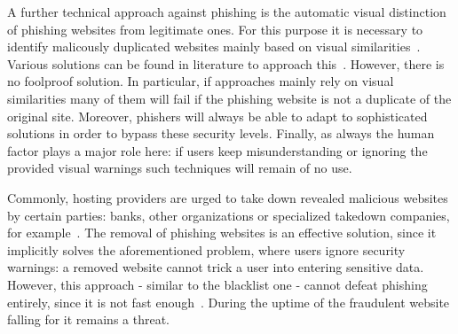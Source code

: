 \begin{description}[leftmargin=0cm]
	\item[Visual distinction] A further technical approach against phishing is the automatic visual distinction of phishing websites from legitimate ones. For this purpose it is necessary to identify malicously duplicated websites mainly based on visual similarities~\cite{liu2006antiphishing}. Various solutions can be found in literature to approach this~\cite{chen2009fighting,chen2010detecting,zhang2011textual}. However, there is no foolproof solution. In particular, if approaches mainly rely on visual similarities many of them will fail if the phishing website is not a duplicate of the original site. Moreover, phishers will always be able to adapt to sophisticated solutions in order to bypass these security levels. Finally, as always the human factor plays a major role here: if users keep misunderstanding or ignoring the provided visual warnings such techniques will remain of no use.
	\item[Takedown] Commonly, hosting providers are urged to take down revealed malicious websites by certain parties: banks, other organizations or specialized takedown companies, for example~\cite{moore2007examining}. The removal of phishing websites is an effective solution, since it implicitly solves the aforementioned problem, where users ignore security warnings: a removed website cannot trick a user into entering sensitive data. However, this approach - similar to the blacklist one - cannot defeat phishing entirely, since it is not fast enough~\cite{moore2007examining}. During the uptime of the fraudulent website falling for it remains a threat.
\end{description}

